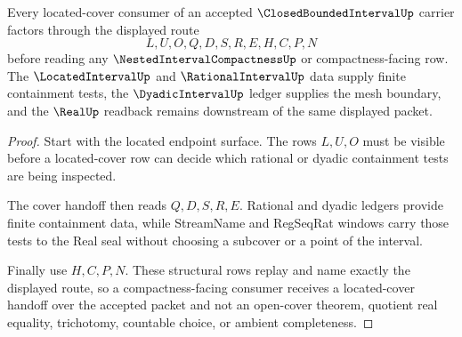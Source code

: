 \begin{theorem}
\label{thm:closed-bounded-interval-located-cover-handoff}
Every located-cover consumer of an accepted $\ClosedBoundedIntervalUp$ carrier factors through the displayed route
$$
L,U,O,Q,D,S,R,E,H,C,P,N
$$
before reading any $\NestedIntervalCompactnessUp$ or compactness-facing row. The $\LocatedIntervalUp$ and $\RationalIntervalUp$ data supply finite containment tests, the $\DyadicIntervalUp$ ledger supplies the mesh boundary, and the $\RealUp$ readback remains downstream of the same displayed packet.
\end{theorem}
\begin{proof}
Start with the located endpoint surface. The rows $L,U,O$ must be visible before a located-cover row can decide which rational or dyadic containment tests are being inspected.

The cover handoff then reads $Q,D,S,R,E$. Rational and dyadic ledgers provide finite containment data, while StreamName and RegSeqRat windows carry those tests to the Real seal without choosing a subcover or a point of the interval.

Finally use $H,C,P,N$. These structural rows replay and name exactly the displayed route, so a compactness-facing consumer receives a located-cover handoff over the accepted packet and not an open-cover theorem, quotient real equality, trichotomy, countable choice, or ambient completeness.
\end{proof}

